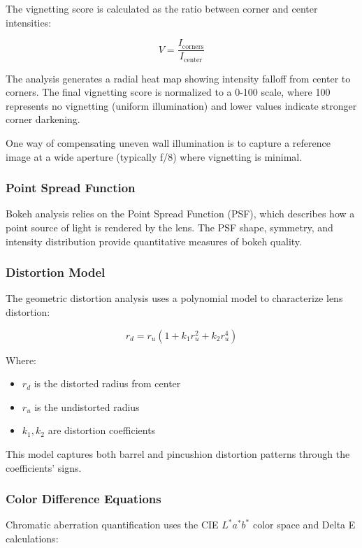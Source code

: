 The vignetting score is calculated as the ratio between corner and center intensities:

\begin{equation}
V = \frac{I_{\text{corners}}}{I_{\text{center}}}
\end{equation}

The analysis generates a radial heat map showing intensity falloff from center to corners. The final vignetting score is normalized to a 0-100 scale, where 100 represents no vignetting (uniform illumination) and lower values indicate stronger corner darkening.

One way of compensating uneven wall illumination is to capture a reference image at a wide aperture (typically f/8) where vignetting is minimal.


\subsubsection{Point Spread Function}
Bokeh analysis relies on the Point Spread Function (PSF), which describes how a point source of light is rendered by the lens. The PSF shape, symmetry, and intensity distribution provide quantitative measures of bokeh quality.

\subsubsection{Distortion Model}
The geometric distortion analysis uses a polynomial model to characterize lens distortion:

\begin{equation}
r_d = r_u \left(1 + k_1 r_u^2 + k_2 r_u^4\right)
\end{equation}

Where:
\begin{itemize}
    \item \( r_d \) is the distorted radius from center
    \item \( r_u \) is the undistorted radius
    \item \( k_1, k_2 \) are distortion coefficients
\end{itemize}

This model captures both barrel and pincushion distortion patterns through the coefficients' signs.

\subsubsection{Color Difference Equations}
Chromatic aberration quantification uses the CIE \( L^*a^*b^* \) color space and Delta E calculations:

